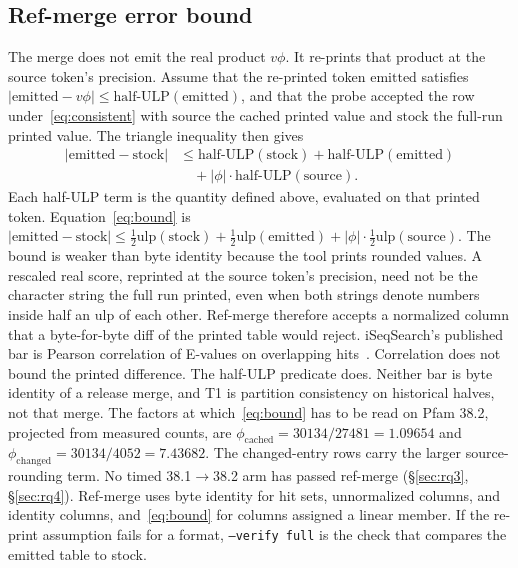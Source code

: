 \documentclass[letterpaper,twocolumn,10pt]{article}
\begin{document}
\subsection{Ref-merge error bound}

The merge does not emit the real product $v\phi$.
It re-prints that product at the source token's precision.
Assume that the re-printed token $\mathrm{emitted}$ satisfies
$|\mathrm{emitted} - v\phi| \le \mathrm{half\text{-}ULP}(\mathrm{emitted})$,
and that the probe accepted the row under~\eqref{eq:consistent} with $\mathrm{source}$ the cached printed value and $\mathrm{stock}$ the full-run printed value.
The triangle inequality then gives
\begin{equation}
\begin{aligned}
|\mathrm{emitted} - \mathrm{stock}|
  &\le \mathrm{half\text{-}ULP}(\mathrm{stock})
    + \mathrm{half\text{-}ULP}(\mathrm{emitted}) \\
  &\quad + |\phi|\cdot \mathrm{half\text{-}ULP}(\mathrm{source}).
\end{aligned}
\label{eq:bound}
\end{equation}
Each half-ULP term is the quantity defined above, evaluated on that printed token.
Equation~\eqref{eq:bound} is
$|\mathrm{emitted}-\mathrm{stock}| \le \tfrac{1}{2}\mathrm{ulp}(\mathrm{stock}) + \tfrac{1}{2}\mathrm{ulp}(\mathrm{emitted}) + |\phi|\cdot\tfrac{1}{2}\mathrm{ulp}(\mathrm{source})$.
The bound is weaker than byte identity because the tool prints rounded values.
A rescaled real score, reprinted at the source token's precision, need not be the character string the full run printed, even when both strings denote numbers inside half an ulp of each other.
Ref-merge therefore accepts a normalized column that a byte-for-byte diff of the printed table would reject.
iSeqSearch's published bar is Pearson correlation of E-values on overlapping hits~\cite{yoo2025iseqsearch}.
Correlation does not bound the printed difference.
The half-ULP predicate does.
Neither bar is byte identity of a release merge, and T1 is partition consistency on historical halves, not that merge.
The factors at which~\eqref{eq:bound} has to be read on Pfam 38.2, projected from measured counts, are
$\phi_{\mathrm{cached}} = 30134/27481 = 1.09654$
and
$\phi_{\mathrm{changed}} = 30134/4052 = 7.43682$.
The changed-entry rows carry the larger source-rounding term.
No timed 38.1$\to$38.2 arm has passed ref-merge (\S\ref{sec:rq3}, \S\ref{sec:rq4}).
Ref-merge uses byte identity for hit sets, unnormalized columns, and identity columns, and~\eqref{eq:bound} for columns assigned a linear member.
If the re-print assumption fails for a format, \texttt{--verify full} is the check that compares the emitted table to stock.
\end{document}
